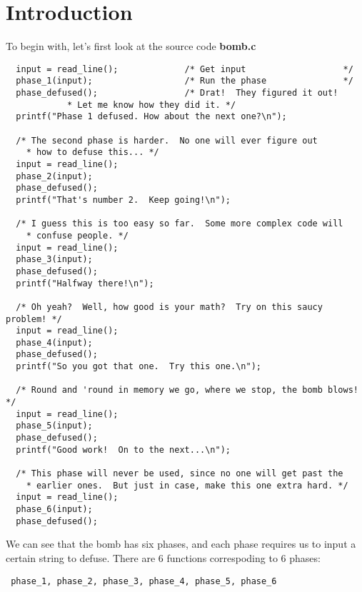
\section*{Introduction}
To begin with, let's first look at the source code \textbf{bomb.c}
\begin{verbatim}
  input = read_line();             /* Get input                   */
  phase_1(input);                  /* Run the phase               */
  phase_defused();                 /* Drat!  They figured it out!
            * Let me know how they did it. */
  printf("Phase 1 defused. How about the next one?\n");

  /* The second phase is harder.  No one will ever figure out
    * how to defuse this... */
  input = read_line();
  phase_2(input);
  phase_defused();
  printf("That's number 2.  Keep going!\n");

  /* I guess this is too easy so far.  Some more complex code will
    * confuse people. */
  input = read_line();
  phase_3(input);
  phase_defused();
  printf("Halfway there!\n");

  /* Oh yeah?  Well, how good is your math?  Try on this saucy problem! */
  input = read_line();
  phase_4(input);
  phase_defused();
  printf("So you got that one.  Try this one.\n");
  
  /* Round and 'round in memory we go, where we stop, the bomb blows! */
  input = read_line();
  phase_5(input);
  phase_defused();
  printf("Good work!  On to the next...\n");

  /* This phase will never be used, since no one will get past the
    * earlier ones.  But just in case, make this one extra hard. */
  input = read_line();
  phase_6(input);
  phase_defused();
\end{verbatim}

We can see that the bomb has six phases, and each phase requires us to input a certain string to defuse. There are 6 functions correspoding to 6 phases: \begin{verbatim} phase_1, phase_2, phase_3, phase_4, phase_5, phase_6 \end{verbatim}

\newpage
